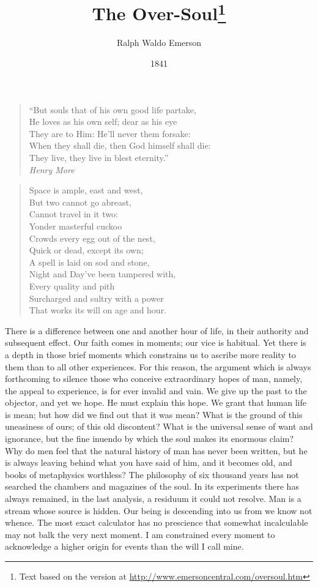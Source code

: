 \documentclass{article}
\title{The Over-Soul\thanks{Text based on the version at \url{http://www.emersoncentral.com/oversoul.htm}}}
\author{Ralph Waldo Emerson}
\date{1841}
\begin{document}
\pagestyle{fancy}
\maketitle


\begin{verse}
    ``But souls that of his own good life partake,\\
    He loves as his own self; dear as his eye\\
    They are to Him: He'll never them forsake:\\
    When they shall die, then God himself shall die:\\
    They live, they live in blest eternity.''\\
      \hspace{1in}                                            \emph{Henry More}
\end{verse}
\begin{verse}
    Space is ample, east and west,\\
    But two cannot go abreast,\\
    Cannot travel in it two:\\
    Yonder masterful cuckoo\\
    Crowds every egg out of the nest,\\
    Quick or dead, except its own;\\
    A spell is laid on sod and stone,\\
    Night and Day've been tampered with,\\
    Every quality and pith\\
    Surcharged and sultry with a power\\
    That works its will on age and hour.
\end{verse}


There is a difference between one and another hour of life, in their authority and subsequent effect. Our faith comes in moments; our vice is habitual. Yet there is a depth in those brief moments which constrains us to ascribe more reality to them than to all other experiences. For this reason, the argument which is always forthcoming to silence those who conceive extraordinary hopes of man, namely, the appeal to experience, is for ever invalid and vain. We give up the past to the objector, and yet we hope. He must explain this hope. We grant that human life is mean; but how did we find out that it was mean? What is the ground of this uneasiness of ours; of this old discontent? What is the universal sense of want and ignorance, but the fine inuendo by which the soul makes its enormous claim? Why do men feel that the natural history of man has never been written, but he is always leaving behind what you have said of him, and it becomes old, and books of metaphysics worthless? The philosophy of six thousand years has not searched the chambers and magazines of the soul. In its experiments there has always remained, in the last analysis, a residuum it could not resolve. Man is a stream whose source is hidden. Our being is descending into us from we know not whence. The most exact calculator has no prescience that somewhat incalculable may not balk the very next moment. I am constrained every moment to acknowledge a higher origin for events than the will I call mine.
\end{document}
